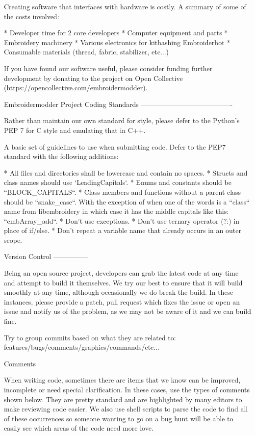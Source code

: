 \documentclass[a4paper]{report}
\begin{document}
Creating software that interfaces with hardware is costly. A summary of some of the costs involved:

* Developer time for 2 core developers
* Computer equipment and parts
* Embroidery machinery
* Various electronics for kitbashing Embroiderbot
* Consumable materials (thread, fabric, stabilizer, etc...)

If you have found our software useful, please consider funding further development by donating to the project on Open Collective
(\url{https://opencollective.com/embroidermodder}).

Embroidermodder Project Coding Standards
----------------------------------------

Rather than maintain our own standard for style, please defer to
the Python's PEP 7 \citep{pep7} for C style and emulating that in C++.

A basic set of guidelines to use when submitting code. Defer to the PEP7 standard with the following additions:

* All files and directories shall be lowercase and contain no spaces.
* Structs and class names should use `LeadingCapitals`.
* Enums and constants should be ``BLOCK\_CAPITALS``.
* Class members and functions without a parent class should be ``snake\_case``.
  With the exception of when one of the words is a ``class`` name from
  libembroidery in which case it has the middle capitals like this:
  ``embArray\_add``.
* Don't use exceptions.
* Don't use ternary operator (?:) in place of if/else.
* Don't repeat a variable name that already occurs in an outer scope.

Version Control
---------------

Being an open source project, developers can grab the latest code at any
time and attempt to build it themselves. We try our best to ensure that
it will build smoothly at any time, although occasionally we do break
the build. In these instances, please provide a patch, pull request
which fixes the issue or open an issue and notify us of the problem, as
we may not be aware of it and we can build fine.

Try to group commits based on what they are related to:
features/bugs/comments/graphics/commands/etc...

Comments
~~~~~~~~

When writing code, sometimes there are items that we know can be
improved, incomplete or need special clarification. In these cases, use
the types of comments shown below. They are pretty standard and are
highlighted by many editors to make reviewing code easier. We also use
shell scripts to parse the code to find all of these occurrences so
someone wanting to go on a bug hunt will be able to easily see which
areas of the code need more love.
\end{document}
